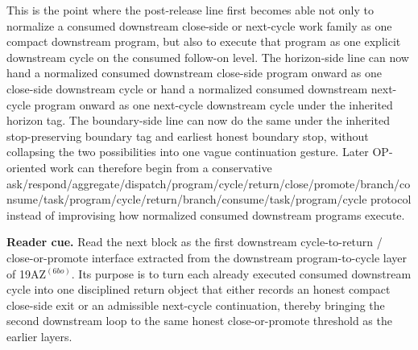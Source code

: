 \begin{remark}
\label{rem:what-the-first-downstream-program-to-cycle-layer-on-the-consumed-follow-on-level-now-buys}
This is the point where the post-release line first becomes able not only to normalize a consumed downstream close-side or next-cycle work family as one compact downstream program, but also to execute that program as one explicit downstream cycle on the consumed follow-on level. The horizon-side line can now hand a normalized consumed downstream close-side program onward as one close-side downstream cycle or hand a normalized consumed downstream next-cycle program onward as one next-cycle downstream cycle under the inherited horizon tag. The boundary-side line can now do the same under the inherited stop-preserving boundary tag and earliest honest boundary stop, without collapsing the two possibilities into one vague continuation gesture. Later OP-oriented work can therefore begin from a conservative ask/\allowbreak{}respond/\allowbreak{}aggregate/\allowbreak{}dispatch/\allowbreak{}program/\allowbreak{}cycle/\allowbreak{}return/\allowbreak{}close/\allowbreak{}promote/\allowbreak{}branch/\allowbreak{}consume/\allowbreak{}task/\allowbreak{}program/\allowbreak{}cycle/\allowbreak{}return/\allowbreak{}branch/\allowbreak{}consume/\allowbreak{}task/\allowbreak{}program/\allowbreak{}cycle protocol instead of improvising how normalized consumed downstream programs execute.
\end{remark}


\noindent\textbf{Reader cue.} Read the next block as the first downstream cycle-to-return / close-or-promote interface extracted from the downstream program-to-cycle layer of 19AZ$^{(6bo)}$. Its purpose is to turn each already executed consumed downstream cycle into one disciplined return object that either records an honest compact close-side exit or an admissible next-cycle continuation, thereby bringing the second downstream loop to the same honest close-or-promote threshold as the earlier layers.


